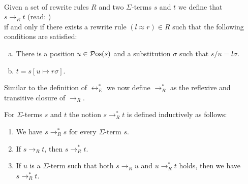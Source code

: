 \begin{Definition} \hspace*{\fill} \\
  Given a set of rewrite rules $R$ and two $\Sigma$-terms $s$ and $t$ we define that
  \\[0.2cm]
  \hspace*{1.3cm}
  $s \rightarrow_R t$ \quad (read: )
  \\[0.2cm]
  if and only if there exists a rewrite rule $(l \approx r) \in R$ such that the following conditions are satisfied:
  \begin{enumerate}[(a)]
  \item There is a position $u \in \mathcal{P}\mathrm{os}(s)$ and a substitution $\sigma$ such that $s/u = l\sigma$.
  \item $t = s[u \mapsto r\sigma]$. \eox
  \end{enumerate}
\end{Definition}
Similar to the definition of $\leftrightarrow_E^*$  we now define $\rightarrow_R^*$ as the reflexive and transitive closure of $\rightarrow_R$.
\begin{Definition}[$\rightarrow_R^*$]
  For $\Sigma$-terms $s$ and $t$ the notion $s \rightarrow_R^* t$ is defined inductively as follows:
  \begin{enumerate}
  \item We have $s \rightarrow_R^* s$ for every $\Sigma$-term $s$.
  \item If $s \rightarrow_R t$, then $s \rightarrow_R^* t$.
  \item If $u$ is a $\Sigma$-term such that both $s \rightarrow_R u$ and $u \rightarrow_R^* t$ holds,
        then we have $s \rightarrow_R^* t$. \eod
  \end{enumerate}
\end{Definition}

